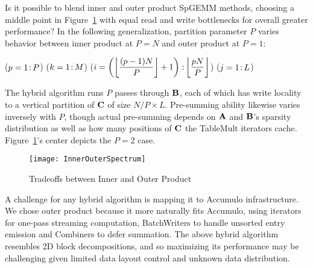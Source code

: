 Is it possible to blend inner and outer product SpGEMM methods,
choosing a middle point in Figure~\ref{fInnerOuterSpectrum}
with equal read and write bottlenecks for overall greater performance?
In the following generalization, 
partition parameter $P$ varies behavior between
inner product at $P=N$ and outer product at $P=1$:

\removelatexerror
\begin{algorithm}[H]
\vspace{\algspace}
\fore($p = 1\colon\! P$){
\fore($k = 1\colon\! M$){
\fore({$i = \left( \floor*{\dfrac{(p-1)N}{P}}+1 \right) \col \floor*{\dfrac{p N}{P}}$}){
\fore($j = 1\colon\! L$){
}}}}
\vspace{\algspace}
\end{algorithm}

The hybrid algorithm runs $P$ passes through $\mathbf{B}$,
each of which has write locality to a vertical partition of $\mathbf{C}$ of size $N/P \times L$.
Pre-summing ability likewise varies inversely with $P$, 
though actual pre-summing depends on
$\mathbf{A}$ and $\mathbf{B}$'s  sparsity distribution
as well as how many positions of $\mathbf{C}$ the TableMult iterators cache.
Figure~\ref{fInnerOuterSpectrum}'s center depicts the $P=2$ case.

\begin{figure}[htb]
\vspace{-4pt}
\centering
\texttt{[image: InnerOuterSpectrum]}
\vspace{-14pt}
\caption{Tradeoffs between Inner and Outer Product}
\label{fInnerOuterSpectrum}
\vspace{-4pt}
\end{figure}


A challenge for any hybrid algorithm is mapping it to Accumulo infrastructure.
We chose outer product because it more naturally fits Accumulo, 
using iterators for one-pass streaming computation, 
BatchWriters to handle unsorted entry emission and Combiners to defer summation.
The above hybrid algorithm resembles 2D block decompositions,
and so maximizing its performance may be challenging 
given limited data layout control and unknown data distribution.



